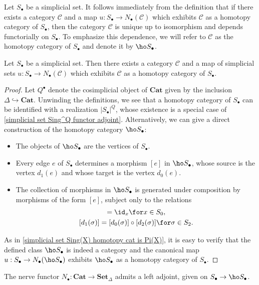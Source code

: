 Let $S_\bullet$ be a simplicial set. It follows immediately from the definition that if there exists a category $\mathcal{C}$ and a map $u:S_\bullet\to N_\bullet(\mathcal{C})$ which exhibits $\mathcal{C}$ as a homotopy category of $S_\bullet$, then the category $\mathcal{C}$ is unique up to isomorphism and depends functorially on $S_\bullet$. To emphasize this dependence, we will refer to $\mathcal{C}$ as the homotopy category of $S_\bullet$ and denote it by $\ho S_\bullet$.
\begin{proposition}\label{simplicial set homotopy cat exist}
Let $S_\bullet$ be a simplicial set. Then there exists a category $\mathcal{C}$ and a map of simplicial sets $u:S_\bullet\to N_\bullet(\mathcal{C})$ which exhibits $\mathcal{C}$ as a homotopy category of $S_\bullet$.
\end{proposition}
\begin{proof}
Let $Q^\bullet$ denote the cosimplicial object of $\mathbf{Cat}$ given by the inclusion $\Delta\hookrightarrow\mathbf{Cat}$. Unwinding the definitions, we see that a homotopy category of $S_\bullet$ can be identified with a realization $|S_\bullet|^Q$, whose existence is a special case of \cref{simplicial set Sing^Q functor adjoint}. Alternatively, we can give a direct construction of the homotopy category $\ho S_\bullet$:
\begin{itemize}
\item The objects of $\ho S_\bullet$ are the vertices of $S_\bullet$.
\item Every edge $e$ of $S_\bullet$ determines a morphism $[e]$ in $\ho S_\bullet$, whose source is the vertex $d_1(e)$ and whose target is the vertex $d_0(e)$.
\item The collection of morphisms in $\ho S_\bullet$ is generated under composition by morphisms of the form $[e]$, subject only to the relations
\begin{gather*}
[s_0(x)]=\id_x\for x\in S_0,\\
[d_1(\sigma)]=[d_0(\sigma)]\circ[d_2(\sigma)]\for \sigma\in S_2.
\end{gather*}
\end{itemize}
As in \cref{simplicial set Sing(X) homotopy cat is Pi(X)}, it is easy to verify that the defined class $\ho S_\bullet$ is indeed a category and the canonical map $u:S_\bullet\to N_\bullet(\ho S_\bullet)$ exhibits $\ho S_\bullet$ as a homotopy category of $S_\bullet$. 
\end{proof}
\begin{corollary}\label{simplicial set nerve and homotopy cat adjoint}
The nerve functor $N_\bullet:\mathbf{Cat}\to\mathbf{Set}_\Delta$ admits a left adjoint, given on $S_\bullet\to \ho S_\bullet$.
\end{corollary}

